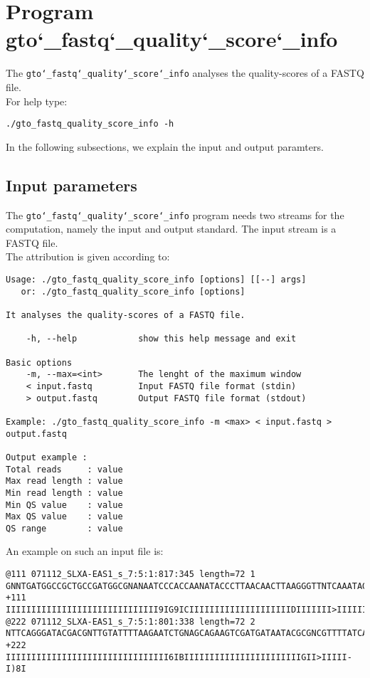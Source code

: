 \section{Program gto\char`_fastq\char`_quality\char`_score\char`_info}
The \texttt{gto\char`_fastq\char`_quality\char`_score\char`_info} analyses the quality-scores of a FASTQ file.\\
For help type:
\begin{lstlisting}
./gto_fastq_quality_score_info -h
\end{lstlisting}
In the following subsections, we explain the input and output paramters.

\subsection*{Input parameters}

The \texttt{gto\char`_fastq\char`_quality\char`_score\char`_info} program needs two streams for the computation, namely the input and output standard. The input stream is a FASTQ file.\\
The attribution is given according to:
\begin{lstlisting}
Usage: ./gto_fastq_quality_score_info [options] [[--] args]
   or: ./gto_fastq_quality_score_info [options]

It analyses the quality-scores of a FASTQ file.

    -h, --help            show this help message and exit

Basic options
    -m, --max=<int>       The lenght of the maximum window
    < input.fastq         Input FASTQ file format (stdin)
    > output.fastq        Output FASTQ file format (stdout)

Example: ./gto_fastq_quality_score_info -m <max> < input.fastq > output.fastq

Output example :
Total reads     : value
Max read length : value
Min read length : value
Min QS value    : value
Max QS value    : value
QS range        : value
\end{lstlisting}
An example on such an input file is:
\begin{lstlisting}
@111 071112_SLXA-EAS1_s_7:5:1:817:345 length=72 1
GNNTGATGGCCGCTGCCGATGGCGNANAATCCCACCAANATACCCTTAACAACTTAAGGGTTNTCAAATAGA
+111
IIIIIIIIIIIIIIIIIIIIIIIIIIIIII9IG9ICIIIIIIIIIIIIIIIIIIIIDIIIIIII>IIIIII/
@222 071112_SLXA-EAS1_s_7:5:1:801:338 length=72 2
NTTCAGGGATACGACGNTTGTATTTTAAGAATCTGNAGCAGAAGTCGATGATAATACGCGNCGTTTTATCAN
+222
IIIIIIIIIIIIIIIIIIIIIIIIIIIIIIII6IBIIIIIIIIIIIIIIIIIIIIIIIGII>IIIII-I)8I
\end{lstlisting}

